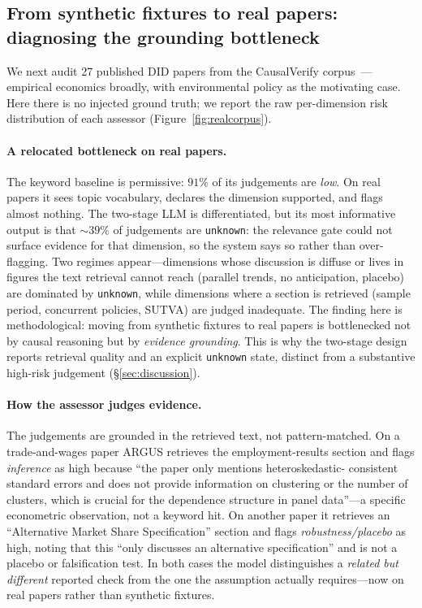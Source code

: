 \subsection{From synthetic fixtures to real papers: diagnosing the grounding
bottleneck}
\label{sec:realpapers}
We next audit 27 published DID papers from the CausalVerify corpus~\cite{causalverify_dataset}---%
empirical economics broadly, with environmental policy as the motivating case.
Here there is no injected ground truth; we report the raw per-dimension risk
distribution of each assessor (Figure~\ref{fig:realcorpus}).

\paragraph{A relocated bottleneck on real papers.}
The keyword baseline is permissive: $91\%$ of its judgements are \emph{low}. On
real papers it sees topic vocabulary, declares the dimension supported, and flags
almost nothing. The two-stage LLM is differentiated, but its most
informative output is that $\sim$$39\%$ of judgements are \texttt{unknown}: the
relevance gate could not surface evidence for that dimension, so the system says
so rather than over-flagging. Two regimes appear---dimensions whose discussion is
diffuse or lives in figures the text retrieval cannot reach (parallel trends, no
anticipation, placebo) are dominated by \texttt{unknown}, while dimensions where a
section is retrieved (sample period, concurrent policies, SUTVA) are judged
inadequate. The finding here is methodological: moving from synthetic fixtures to
real papers is bottlenecked not by causal reasoning but by \emph{evidence
grounding}. This is why the two-stage design reports retrieval quality and an
explicit \texttt{unknown} state, distinct from a substantive high-risk judgement
(\S\ref{sec:discussion}).

\paragraph{How the assessor judges evidence.}
The judgements are grounded in the retrieved text, not pattern-matched. On a
trade-and-wages paper ARGUS retrieves the employment-results section and flags
\emph{inference} as high because ``the paper only mentions heteroskedastic-%
consistent standard errors and does not provide information on clustering or the
number of clusters, which is crucial for the dependence structure in panel
data''---a specific econometric observation, not a keyword hit. On another paper
it retrieves an ``Alternative Market Share Specification'' section and flags
\emph{robustness/placebo} as high, noting that this ``only discusses an
alternative specification'' and is not a placebo or falsification test. In both
cases the model distinguishes a \emph{related but different} reported check from
the one the assumption actually requires---now on real papers rather than
synthetic fixtures.

